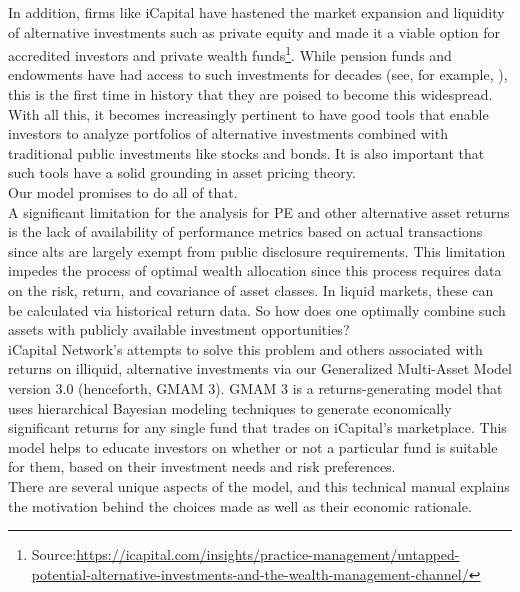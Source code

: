 \documentclass[11pt]{article}
\begin{document}
In addition, firms like iCapital have hastened the market expansion and liquidity of alternative investments such as private equity and made it a viable option for accredited investors and private wealth funds\footnote{Source:\href{https://icapital.com/insights/practice-management/untapped-potential-alternative-investments-and-the-wealth-management-channel/}{https://icapital.com/insights/practice-management/untapped-potential-alternative-investments-and-the-wealth-management-channel/}}. While pension funds and endowments have had access to such investments for decades (see, for example, \cite{Takahashi2002}), this is the first time in history that they are poised to become this widespread. With all this, it becomes increasingly pertinent to have good tools that enable investors to analyze portfolios of alternative investments combined with traditional public investments like stocks and bonds. It is also important that such tools have a solid grounding in asset pricing theory. \\

Our model promises to do all of that. \\

A significant limitation for the analysis for PE and other alternative asset returns is the lack of availability of performance metrics based on actual transactions since alts are largely exempt from public disclosure requirements. This limitation impedes the process of optimal wealth allocation since this process requires data on the risk, return, and covariance of asset classes. In liquid markets, these can be calculated via historical return data. So how does one optimally combine such assets with publicly available investment opportunities? \\

iCapital Network’s attempts to solve this problem and others associated with returns on illiquid, alternative investments via our Generalized Multi-Asset Model version 3.0 (henceforth, GMAM 3). GMAM 3 is a returns-generating model that uses hierarchical Bayesian modeling techniques to generate economically significant returns for any single fund that trades on iCapital’s marketplace. This model helps to educate investors on whether or not a particular fund is suitable for them, based on their investment needs and risk preferences. \\

There are several unique aspects of the model, and this technical manual explains the motivation behind the choices made as well as their economic rationale.
\end{document}
